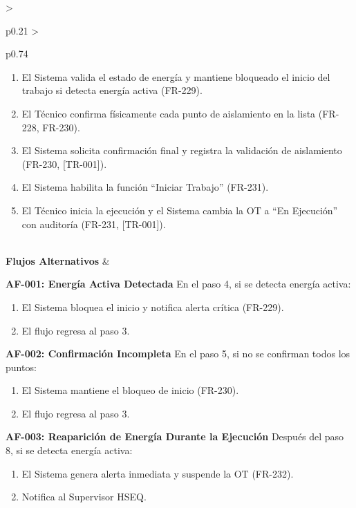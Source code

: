 \begin{longtable}{>{\raggedright\arraybackslash}p{0.21\textwidth} >{\raggedright\arraybackslash}p{0.74\textwidth}}
{\begin{enumerate}[leftmargin=1.5em, nosep, topsep=0pt]
\item El Sistema valida el estado de energía y mantiene bloqueado el inicio del trabajo si detecta energía activa (FR-229).
\item El Técnico confirma físicamente cada punto de aislamiento en la lista (FR-228, FR-230).
\item El Sistema solicita confirmación final y registra la validación de aislamiento (FR-230, [TR-001]).
\item El Sistema habilita la función ``Iniciar Trabajo'' (FR-231).
\item El Técnico inicia la ejecución y el Sistema cambia la OT a ``En Ejecución'' con auditoría (FR-231, [TR-001]).
\end{enumerate} \vspace{2pt}} \\
\textbf{Flujos Alternativos} & \parbox[t]{\linewidth}{\vspace{2pt} \vspace{4pt}\noindent\textbf{AF-001: Energía Activa Detectada}
\newline
En el paso 4, si se detecta energía activa:
\begin{enumerate}[leftmargin=1.5em, nosep, topsep=0pt]
\item El Sistema bloquea el inicio y notifica alerta crítica (FR-229).
\item El flujo regresa al paso 3.
\end{enumerate}
\vspace{4pt}\noindent\textbf{AF-002: Confirmación Incompleta}
\newline
En el paso 5, si no se confirman todos los puntos:
\begin{enumerate}[leftmargin=1.5em, nosep, topsep=0pt]
\item El Sistema mantiene el bloqueo de inicio (FR-230).
\item El flujo regresa al paso 3.
\end{enumerate}
\vspace{4pt}\noindent\textbf{AF-003: Reaparición de Energía Durante la Ejecución}
\newline
Después del paso 8, si se detecta energía activa:
\begin{enumerate}[leftmargin=1.5em, nosep, topsep=0pt]
\item El Sistema genera alerta inmediata y suspende la OT (FR-232).
\item Notifica al Supervisor HSEQ.
\end{enumerate} \vspace{2pt}} \\

\end{longtable}
